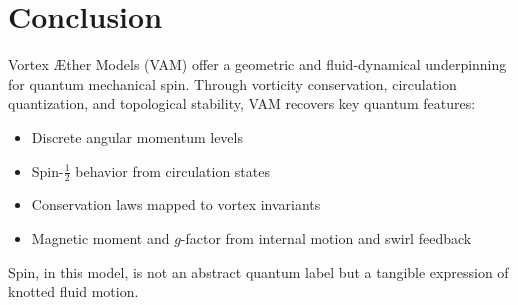 \section*{Conclusion}

Vortex Æther Models (VAM) offer a geometric and fluid-dynamical underpinning for quantum mechanical spin. Through vorticity conservation, circulation quantization, and topological stability, VAM recovers key quantum features:

\begin{itemize}

\item Discrete angular momentum levels

\item Spin-$\tfrac{1}{2}$ behavior from circulation states

\item Conservation laws mapped to vortex invariants

\item Magnetic moment and $g$-factor from internal motion and swirl feedback

\end{itemize}

Spin, in this model, is not an abstract quantum label but a tangible expression of knotted fluid motion.


